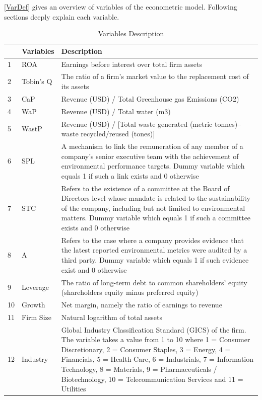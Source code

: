 \documentclass[12pt,]{article}
\begin{document}
\autoref{VarDef} gives an overview of variables of the econometric
model. Following sections deeply explain each variable.

\begin{table}[h]
\centering
\caption{Variables Description} 
\label{VarDef}
\begin{tabular}{lp{3cm}p{10cm}}
  \hline
\hline
 & Variables & Description \\ 
  \hline
1 & ROA & Earnings before interest over total firm assets \\ 
  2 & Tobin's Q & The ratio of a firm’s market value to the replacement cost of its assets \\ 
  3 & CaP & Revenue (USD) / Total Greenhouse gas Emissions (CO2) \\ 
  4 & WaP & Revenue (USD) / Total water (m3) \\ 
  5 & WastP & Revenue (USD) / [Total waste generated (metric tonnes)–waste recycled/reused (tones)] \\ 
  6 & SPL & A mechanism to link the remuneration of any member of a company's senior executive team with the achievement of environmental performance targets. Dummy variable which equals 1 if such a link exists and 0 otherwise \\ 
  7 & STC & Refers to the existence of a committee at the Board of Directors level whose mandate is related to the sustainability of the company, including but not limited to environmental matters. Dummy variable which equals 1 if such a committee exists and 0 otherwise \\ 
  8 & A & Refers to the case where a company provides evidence that the latest reported environmental metrics were audited by a third party. Dummy variable which equals 1 if such evidence exist and 0 otherwise \\ 
  9 & Leverage & The ratio of long-term debt to common shareholders' equity (shareholders equity minus preferred equity) \\ 
  10 & Growth & Net margin, namely the ratio of earnings to revenue \\ 
  11 & Firm Size & Natural logarithm of total assets \\ 
  12 & Industry & Global Industry Classification Standard (GICS) of the firm. The variable takes a value from 1 to 10 where 1 = Consumer Discretionary, 2 = Consumer Staples, 3 = Energy, 4 = Financials, 5 = Health Care, 6 = Industrials, 7 = Information Technology, 8 = Materials, 9 = Pharmaceuticals / Biotechnology, 10 = Telecommunication Services and 11 = Utilities \\ 
   \hline
\end{tabular}
\end{table}
\end{document}
